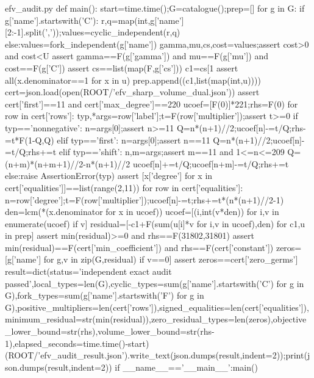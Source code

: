 \documentclass[12pt,a4paper]{article}
\numberwithin{equation}{section}
\theoremstyle{definition}
\begin{document}
\begin{filecontents*}[overwrite]{efv_audit.py}
def main():
    start=time.time();G=catalogue();prep=[]
    for g in G:
        if g['name'].startswith('C'):
            r,q=map(int,g['name'][2:-1].split(','));values=cyclic_independent(r,q)
        else:values=fork_independent(g['name'])
        gamma,mu,cs,cost=values;assert cost>0 and cost<U
        assert gamma==F(g['gamma']) and mu==F(g['mu']) and cost==F(g['C'])
        assert cs==list(map(F,g['cs']))
        c1=cs[1%
        assert all(x.denominator==1 for x in u)
        prep.append((c1,list(map(int,u))))
    cert=json.load(open(ROOT/'efv_sharp_volume_dual.json'))
    assert cert['first']==11 and cert['max_degree']==220
    ucoef=[F(0)]*221;rhs=F(0)
    for row in cert['rows']:
        typ,*args=row['label'];t=F(row['multiplier']);assert t>=0
        if typ=='nonnegative':
            n=args[0];assert n>=11
            Q=n*(n+1)//2;ucoef[n]-=t/Q;rhs-=t*F(1-Q,Q)
        elif typ=='first':
            n=args[0];assert n==11
            Q=n*(n+1)//2;ucoef[n]-=t/Q;rhs+=t
        elif typ=='shift':
            n,m=args;assert m==11 and 1<=n<=209
            Q=(n+m)*(n+m+1)//2-n*(n+1)//2
            ucoef[n]+=t/Q;ucoef[n+m]-=t/Q;rhs+=t
        else:raise AssertionError(typ)
    assert [x['degree'] for x in cert['equalities']]==list(range(2,11))
    for row in cert['equalities']:
        n=row['degree'];t=F(row['multiplier']);ucoef[n]-=t;rhs+=t*(n*(n+1)//2-1)
    den=lcm(*(x.denominator for x in ucoef))
    ucoef=[(i,int(v*den)) for i,v in enumerate(ucoef) if v]
    residual=[-c1+F(sum(u[i]*v for i,v in ucoef),den) for c1,u in prep]
    assert min(residual)>=0 and rhs==F(31802,31801)
    assert min(residual)==F(cert['min_coefficient']) and rhs==F(cert['constant'])
    zeros=[g['name'] for g,v in zip(G,residual) if v==0]
    assert zeros==cert['zero_germs']
    result=dict(status='independent exact audit passed',local_types=len(G),cyclic_types=sum(g['name'].startswith('C') for g in G),fork_types=sum(g['name'].startswith('F') for g in G),positive_multipliers=len(cert['rows']),signed_equalities=len(cert['equalities']),minimum_residual=str(min(residual)),zero_residual_types=len(zeros),objective_lower_bound=str(rhs),volume_lower_bound=str(rhs-1),elapsed_seconds=time.time()-start)
    (ROOT/'efv_audit_result.json').write_text(json.dumps(result,indent=2));print(json.dumps(result,indent=2))
if __name__=='__main__':main()
\end{filecontents*}
\end{document}

